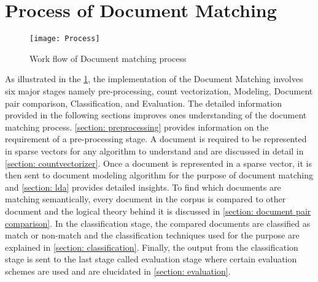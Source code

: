 \section{Process of Document Matching}
\label{section: process of document matching}

\begin{figure}[htp]
	\centering
		\texttt{[image: Process]}
	\caption{Work flow of Document matching process}
	\label{fig:process}
\end{figure}

As illustrated in the \ref{fig:process}, the implementation of the Document Matching involves six major stages namely pre-processing, count vectorization, Modeling, Document pair comparison, Classification, and Evaluation. The detailed information provided in the following sections improves ones understanding of the document matching process. \ref{section: preprocessing} provides information on the requirement of a pre-processing stage. A document is required to be represented in sparse vectors for any algorithm to understand and are discussed in detail in \ref{section: countvectorizer}. Once a document is represented in a sparse vector, it is then sent to document modeling algorithm for the purpose of document matching and \ref{section: lda} provides detailed insights. To find which documents are matching semantically, every document in the corpus is compared to other document and the logical theory behind it is discussed in \ref{section: document pair comparison}. In the classification stage, the compared documents are classified as match or non-match and the classification techniques used for the purpose are explained in \ref{section: classification}. Finally, the output from the classification stage is sent to the last stage called evaluation stage where certain evaluation schemes are used and are elucidated in \ref{section: evaluation}.


